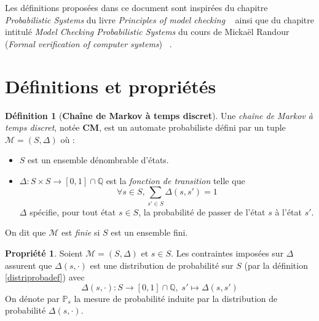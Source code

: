 \documentclass[12pt,a4paper]{report}
\theoremstyle{definition}%
\newtheorem{definition}{Définition}[chapter]
\newtheorem{propriete}{Propriété}[chapter]
\theoremstyle{remark}
\newcommand{\pr}{\mathbb{P}}
\let\labelitemi\labelitemii
\begin{document}
Les définitions proposées dans ce document sont inspirées du chapitre \textit{Probabilistic Systems} du livre \textit{Principles of model checking} ~\cite{DBLP:books/daglib/0020348} ainsi que du chapitre intitulé \textit{Model Checking Probabilistic Systems} du cours de Mickaël Randour (\textit{Formal verification of computer systems}) ~\cite{Course1}.

\section{Définitions et propriétés}

\theoremstyle{definition}
\begin{definition}[\textbf{Chaîne de Markov à temps discret}]
	
	Une \textit{chaîne de Markov à temps discret}, notée \textbf{CM}, est un automate probabiliste défini par un tuple  $\mathcal{M} = (S, \Delta)$ où :
	\begin{itemize}
		\renewcommand{\labelitemi}{\tiny$\bullet$}
		\item $S$ est un ensemble dénombrable d'états.
		\item $\Delta: S \times S \rightarrow [0,1] \cap \mathbb{Q}$ est la \textit{fonction de transition} telle que \[\forall s \in S, \sum_{s' \in S}\Delta(s, s')= 1\]
		$\Delta$ spécifie, pour tout état $s \in S$, la probabilité de passer de l'état $s$ à l'état $s'$. 
	\end{itemize}
	On dit que $\mathcal{M}$ est \textit{finie} si $S$ est un ensemble fini.
\end{definition}

\begin{propriete} \label{distribmarkov}
	Soient $\mathcal{M} = (S, \Delta)$ et $s \in S$.
	Les contraintes imposées sur $\Delta$ assurent que $\Delta(s, \cdot)$ est une distribution de probabilité sur $S$  (par la définition \ref{distriprobadef}) avec \[\Delta(s, \cdot) : S \rightarrow [0, 1] \cap \mathbb{Q}, \; s' \mapsto \Delta(s, s')\] On dénote par $\pr_s$ la mesure de probabilité induite par la distribution de probabilité $\Delta(s, \cdot)$.%
\end{propriete}
\end{document}
